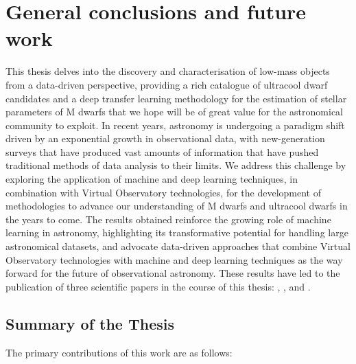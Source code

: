 
\chapter{General conclusions and future work}
\label{chp:general_intro}

This thesis delves into the discovery and characterisation of low-mass objects from a data-driven perspective, providing a rich catalogue of ultracool dwarf candidates and a deep transfer learning methodology for the estimation of stellar parameters of M dwarfs that we hope will be of great value for the astronomical community to exploit. In recent years, astronomy is undergoing a paradigm shift driven by an exponential growth in observational data, with new-generation surveys that have produced vast amounts of information that have pushed traditional methods of data analysis to their limits. We address this challenge by exploring the application of machine and deep learning techniques, in combination with Virtual Observatory technologies, for the development of methodologies to advance our understanding of M dwarfs and ultracool dwarfs in the years to come. The results obtained reinforce the growing role of machine learning in astronomy, highlighting its transformative potential for handling large astronomical datasets, and advocate data-driven approaches that combine Virtual Observatory technologies with machine and deep learning techniques as the way forward for the future of observational astronomy. These results have led to the publication of three scientific papers in the course of this thesis: \citet{masbuitrago2022}, \citet{masbuitrago2024}, and \citet{masbuitrago2025}.

\section{Summary of the Thesis}

The primary contributions of this work are as follows:


